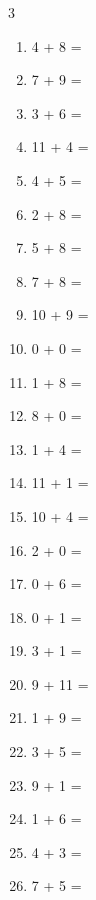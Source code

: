 \documentclass[a4paper, 11pt]{article}
\begin{document}
\begin{multicols}{3}
\begin{enumerate}
      \item 4 + 8 = \dotfill\bigskip
      \item 7 + 9 = \dotfill\bigskip
      \item 3 + 6 = \dotfill\bigskip
      \item 11 + 4 = \dotfill\bigskip
      \item 4 + 5 = \dotfill\bigskip
      \item 2 + 8 = \dotfill\bigskip
      \item 5 + 8 = \dotfill\bigskip
      \item 7 + 8 = \dotfill
      \item 10 + 9 = \dotfill\bigskip
      \item 0 + 0 = \dotfill\bigskip
      \item 1 + 8 = \dotfill\bigskip
      \item 8 + 0 = \dotfill\bigskip
      \item 1 + 4 = \dotfill\bigskip
      \item 11 + 1 = \dotfill\bigskip
      \item 10 + 4 = \dotfill\bigskip
      \item 2 + 0 = \dotfill\bigskip
      \item 0 + 6 = \dotfill\bigskip
      \item 0 + 1 = \dotfill\bigskip
      \item 3 + 1 = \dotfill\bigskip
      \item 9 + 11 = \dotfill\bigskip
      \item 1 + 9 = \dotfill\bigskip
      \item 3 + 5 = \dotfill\bigskip
      \item 9 + 1 = \dotfill\bigskip
      \item 1 + 6 = \dotfill\bigskip
      \item 4 + 3 = \dotfill\bigskip
      \item 7 + 5 = \dotfill
    \end{enumerate}
\end{multicols}
\end{document}
